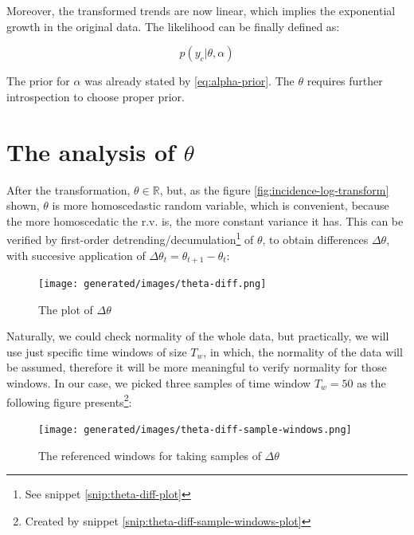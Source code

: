 \documentclass[
  digital, %
  oneside, %
  lof,     %
  lot,     %
]{fithesis4}
\begin{document}
Moreover, the transformed trends are now 
linear, which implies the exponential growth in the original data.
The likelihood can be finally defined as:

\begin{equation}\label{eq:likelihood-first}
  p( y_c | \theta, \alpha )
\end{equation}

The prior for $\alpha$ was already stated by \eqref{eq:alpha-prior}.
The $\theta$ requires further introspection to choose proper prior.


\section{The analysis of \texorpdfstring{$\theta$}{Lg}}

After the transformation, $\theta \in \mathbb{R}$, but, 
as the figure \ref{fig:incidence-log-transform} 
shown, $\theta$ is more homoscedastic random variable, which is 
convenient, because the more homoscedatic 
the r.v. is, the more constant variance 
it has.
This can be verified by first-order detrending/decumulation\footnote{See snippet \ref{snip:theta-diff-plot}} 
of $\theta$, to obtain differences 
$\Delta \theta$, with succesive application of 
$\Delta \theta_t = \theta_{t+1} - \theta_{t}$:

\begin{figure}[H]
  \begin{center}
    \texttt{[image: generated/images/theta-diff.png]}
  \end{center}
  \caption{The plot of $\Delta \theta$}
  \label{fig:theta-diff}
\end{figure}

Naturally, we could check normality of the 
whole data, but practically, we will use just 
specific time windows of size $T_w$, in which, the normality of the data will be assumed,
therefore it will be more meaningful to verify normality for those 
windows. In our case, we picked three samples 
of time window $T_w = 50$ as the following figure 
presents\footnote{Created by snippet \ref{snip:theta-diff-sample-windows-plot}}:

\begin{figure}[H]
  \begin{center}
    \texttt{[image: generated/images/theta-diff-sample-windows.png]}
  \end{center}
  \caption{The referenced windows for taking samples of $\Delta \theta$}
  \label{fig:theta-sample-windows}
\end{figure}
\end{document}
